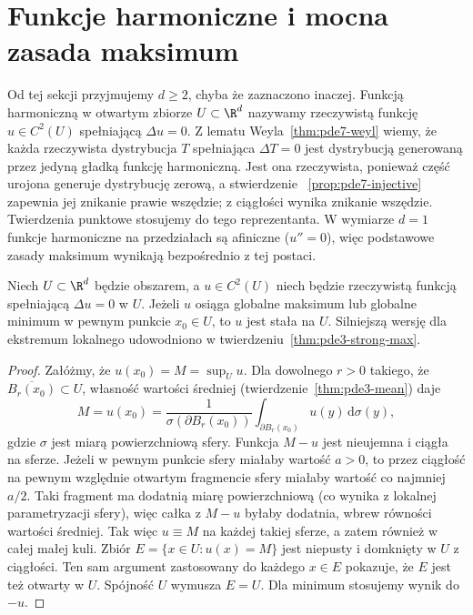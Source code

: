\section{Funkcje harmoniczne i mocna zasada maksimum}
\label{sec:pde14-strong}
Od tej sekcji przyjmujemy $d\ge2$, chyba że zaznaczono inaczej.
Funkcją harmoniczną w otwartym zbiorze $U\subset\R^d$
nazywamy rzeczywistą funkcję $u\in C^2(U)$ spełniającą
$\Delta u=0$. Z lematu Weyla~\ref{thm:pde7-weyl} wiemy,
że każda rzeczywista dystrybucja $T$ spełniająca $\Delta T=0$
jest dystrybucją generowaną przez jedyną gładką funkcję
harmoniczną. Jest ona rzeczywista, ponieważ część urojona
generuje dystrybucję zerową, a stwierdzenie
~\ref{prop:pde7-injective} zapewnia jej znikanie prawie
wszędzie; z ciągłości wynika znikanie wszędzie.
Twierdzenia punktowe stosujemy do tego reprezentanta.
W wymiarze $d=1$ funkcje harmoniczne na przedziałach są
afiniczne ($u''=0$), więc podstawowe zasady maksimum
wynikają bezpośrednio z tej postaci.

\begin{twierdzenie}
\label{thm:pde14-strong}
Niech $U\subset\R^d$ będzie obszarem, a $u\in C^2(U)$
niech będzie rzeczywistą funkcją spełniającą $\Delta u=0$ w $U$.
Jeżeli $u$ osiąga globalne maksimum lub globalne minimum
w pewnym punkcie $x_0\in U$, to $u$ jest stała na $U$.
Silniejszą wersję dla ekstremum lokalnego udowodniono
w twierdzeniu~\ref{thm:pde3-strong-max}.
\end{twierdzenie}
\begin{proof}
Załóżmy, że $u(x_0)=M=\sup_U u$. Dla dowolnego
$r>0$ takiego, że $\overline{B_r(x_0)}\subset U$, własność
wartości średniej (twierdzenie~\ref{thm:pde3-mean}) daje
\[
 M=u(x_0)=\frac{1}{\sigma(\partial B_r(x_0))}
 \int_{\partial B_r(x_0)}u(y)\,\mathrm d\sigma(y),
\]
gdzie $\sigma$ jest miarą powierzchniową sfery.
Funkcja $M-u$ jest nieujemna i ciągła na sferze.
Jeżeli w pewnym punkcie sfery miałaby wartość $a>0$,
to przez ciągłość na pewnym względnie otwartym fragmencie
sfery miałaby wartość co najmniej $a/2$.
Taki fragment ma dodatnią miarę powierzchniową
(co wynika z lokalnej parametryzacji sfery), więc całka
z $M-u$ byłaby dodatnia, wbrew równości wartości średniej.
Tak więc $u\equiv M$ na każdej takiej sferze, a zatem
również w całej małej kuli.
Zbiór $E=\{x\in U:u(x)=M\}$ jest niepusty i domknięty
w $U$ z ciągłości. Ten sam argument zastosowany do każdego
$x\in E$ pokazuje, że $E$ jest też otwarty w $U$.
Spójność $U$ wymusza $E=U$. Dla minimum stosujemy wynik do $-u$.
\end{proof}

